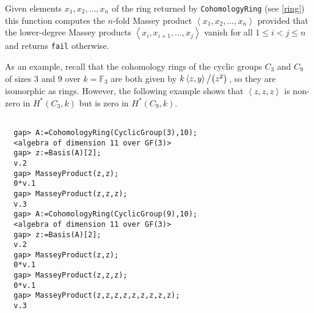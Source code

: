 \documentclass[a4paper,11pt]{report}
\begin{document}
{{{ Given elements  $x_1,x_2,\dots,x_n$  of the ring returned by \texttt{CohomologyRing} (see \ref{ring}) this function computes the $n$-fold Massey product  $\left\langle x_1,x_2,\ldots,x_n\right\rangle$  provided that the lower-degree Massey products  $\left\langle x_i,x_{i+1},\ldots,x_j\right\rangle$  vanish for all $1 \leq i < j \leq n$ and returns \texttt{fail} otherwise. }

 As an example, recall that the cohomology rings of the cyclic groups $C_3$ and $C_9$ of sizes 3 and 9 over $k=\mathbb{F}_3$  are both given by  $k\left\langle z, y\right\rangle\left/\left(z^2\right)\right.$,  so they are isomorphic as rings. However, the following example shows that  $\left\langle z,z,z\right\rangle$  is non-zero in $H^\ast\left(C_3,k\right)$  but is zero in $H^\ast\left(C_9,k\right)$.  
\begin{Verbatim}[fontsize=\small,frame=single,label=Example]
  
  gap> A:=CohomologyRing(CyclicGroup(3),10);
  <algebra of dimension 11 over GF(3)>
  gap> z:=Basis(A)[2];
  v.2
  gap> MasseyProduct(z,z);
  0*v.1
  gap> MasseyProduct(z,z,z);
  v.3
  gap> A:=CohomologyRing(CyclicGroup(9),10);
  <algebra of dimension 11 over GF(3)>
  gap> z:=Basis(A)[2];
  v.2
  gap> MasseyProduct(z,z);
  0*v.1
  gap> MasseyProduct(z,z,z);
  0*v.1
  gap> MasseyProduct(z,z,z,z,z,z,z,z,z);
  v.3
  
\end{Verbatim}
 }

 }

 

\appendix
\end{document}
